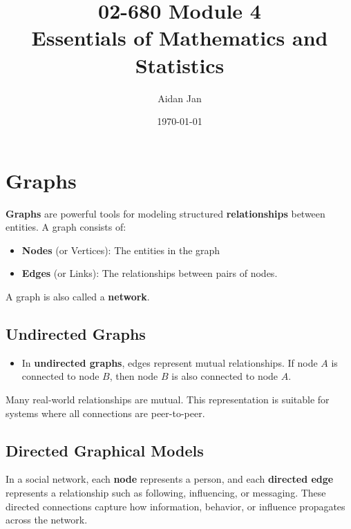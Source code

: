 \documentclass[10pt]{article}
\title{02-680 Module 4 \\ \large{Essentials of Mathematics and Statistics}}
\author{Aidan Jan}
\date{\today}
\begin{document}
\maketitle

\section*{Graphs}
\textbf{Graphs} are powerful tools for modeling structured \textbf{relationships} between entities.  A graph consists of:
\begin{itemize}
	\item \textbf{Nodes} (or Vertices): The entities in the graph
	\item \textbf{Edges} (or Links): The relationships between pairs of nodes.
\end{itemize}
A graph is also called a \textbf{network}.

\subsection*{Undirected Graphs}
\begin{itemize}
	\item In \textbf{undirected graphs}, edges represent mutual relationships.  If node $A$ is connected to node $B$, then node $B$ is also connected to node $A$.
\end{itemize}
Many real-world relationships are mutual.  This representation is suitable for systems where all connections are peer-to-peer.

\subsection*{Directed Graphical Models}
In a social network, each \textbf{node} represents a person, and each \textbf{directed edge} represents a relationship such as following, influencing, or messaging.  These directed connections capture how information, behavior, or influence propagates across the network.
\end{document}

